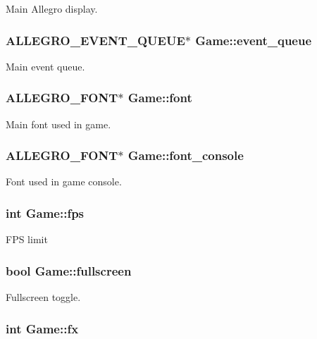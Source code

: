 Main Allegro display. \hypertarget{structGame_a820782e408ff7a704dc12af67eb0c44f}{
\subsubsection[{event\-\_\-queue}]{\setlength{\rightskip}{0pt plus 5cm}A\-L\-L\-E\-G\-R\-O\-\_\-\-E\-V\-E\-N\-T\-\_\-\-Q\-U\-E\-U\-E$\ast$ Game\-::event\-\_\-queue}}\label{structGame_a820782e408ff7a704dc12af67eb0c44f}
Main event queue. \hypertarget{structGame_a455bfdaacd5f2bda80b640c02ec3250e}{
\subsubsection[{font}]{\setlength{\rightskip}{0pt plus 5cm}A\-L\-L\-E\-G\-R\-O\-\_\-\-F\-O\-N\-T$\ast$ Game\-::font}}\label{structGame_a455bfdaacd5f2bda80b640c02ec3250e}
Main font used in game. \hypertarget{structGame_a692f2c3ec0f3e956aa8bdac00a864bf8}{
\subsubsection[{font\-\_\-console}]{\setlength{\rightskip}{0pt plus 5cm}A\-L\-L\-E\-G\-R\-O\-\_\-\-F\-O\-N\-T$\ast$ Game\-::font\-\_\-console}}\label{structGame_a692f2c3ec0f3e956aa8bdac00a864bf8}
Font used in game console. \hypertarget{structGame_a28534ff51b7b2adc76bdd8894a750d0d}{
\subsubsection[{fps}]{\setlength{\rightskip}{0pt plus 5cm}int Game\-::fps}}\label{structGame_a28534ff51b7b2adc76bdd8894a750d0d}
F\-P\-S limit \hypertarget{structGame_a026034417d95688ab99ba2e96e064b7f}{
\subsubsection[{fullscreen}]{\setlength{\rightskip}{0pt plus 5cm}bool Game\-::fullscreen}}\label{structGame_a026034417d95688ab99ba2e96e064b7f}
Fullscreen toggle. \hypertarget{structGame_a10c0e81918f42e7367b4590e6885048e}{
\subsubsection[{fx}]{\setlength{\rightskip}{0pt plus 5cm}int Game\-::fx}}\label{structGame_a10c0e81918f42e7367b4590e6885048e}
